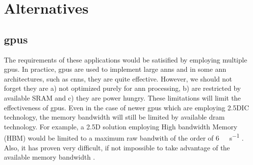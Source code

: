 \iffalse
We believe a system can be designed with \ac{dram} as the primary processing store. This will require careful use of data structures to describe storage within \ac{dram} to ensure we make good use of the potential bandwidth. But there are other benefits we will take advantage of, but more about that later.
\fi

\iffalse
There important application is disparate \ac{ann}s because specifically a form of \ac{dnn}, Convolutional Neural networks (\ac{cnn}) have gotten good press recently, but they are not the only \ac{dnn}.
\fi



\iffalse
So considering the performance improvements observed in other applications, it is expected that many customer facing or edge applications will implement multiple instances of artificial neural networks to perform various functions.
have very large memory and processing requirements.
require multiple instances of \ac{ann}s of similar size to the \ac{ann} described in \cite{krizhevsky2012imagenet}.

For example employing multiple cameras or monitoring and controlling different systems in a drone, a automobile each with an image recognition \ac{ann}\cite{krizhevsky2012imagenet}\cite{bojarski2016end} for navigation, engine monitoring along with other system control.
\fi

\section{Alternatives}
\label{sec:Alternatives}

\subsection{\Acfp{gpu}}
\label{sec:gpu}
The requirements of these applications would be satisified by employing multiple \acp{gpu}.
In practice, \acp{gpu} are used to implement large \ac{ann}s and in some \ac{ann} architectures, such as \acp{cnn}, they are quite effective. However, we should not forget they are a) not optimized purely for \ac{ann} processing, b) are restricted by available SRAM and c) they are power hungry. 
These limitations will limit the effectiveness of \acp{gpu}.
Even in the case of newer \acp{gpu} which are employing 2.5DIC technology, the memory bandwidth will still be limited by available \ac{dram} technology.
For example, a 2.5D solution employing High bandwidth Memory (HBM) would be limited to a maximum raw bandwith of the order of \SI[per-mode=symbol]{6}{\tera \bit \per \second} \cite{Nvidia_p100_summary_datasheet}.
Also, it has proven very difficult, if not impossible to take advantage of the available memory bandwidth \cite{farabet2011neuflow} \cite{tensorflow2015-whitepaper}.

